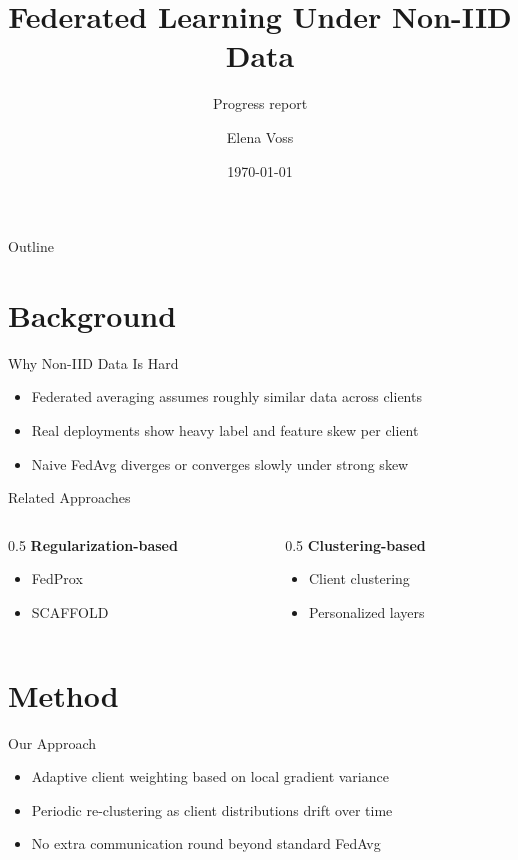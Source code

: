 \documentclass[aspectratio=169]{beamer}
\author{Elena Voss}
\title{Federated Learning Under Non-IID Data}
\subtitle{Progress report}
\institute{Department of Computer Science}
\date{\today}
\begin{document}
\begin{frame}[plain]
  \titlepage
\end{frame}

\begin{frame}{Outline}
  \tableofcontents
\end{frame}

\section{Background}

\begin{frame}{Why Non-IID Data Is Hard}
  \begin{itemize}
    \item Federated averaging assumes roughly similar data across clients
    \item Real deployments show heavy label and feature skew per client
    \item Naive FedAvg diverges or converges slowly under strong skew
  \end{itemize}
\end{frame}

\begin{frame}{Related Approaches}
  \begin{columns}[T]
    \begin{column}{0.5\textwidth}
      \textbf{Regularization-based}
      \begin{itemize}
        \item FedProx
        \item SCAFFOLD
      \end{itemize}
    \end{column}
    \begin{column}{0.5\textwidth}
      \textbf{Clustering-based}
      \begin{itemize}
        \item Client clustering
        \item Personalized layers
      \end{itemize}
    \end{column}
  \end{columns}
\end{frame}

\section{Method}

\begin{frame}{Our Approach}
  \begin{itemize}
    \item Adaptive client weighting based on local gradient variance
    \item Periodic re-clustering as client distributions drift over time
    \item No extra communication round beyond standard FedAvg
  \end{itemize}
\end{frame}
\end{document}
